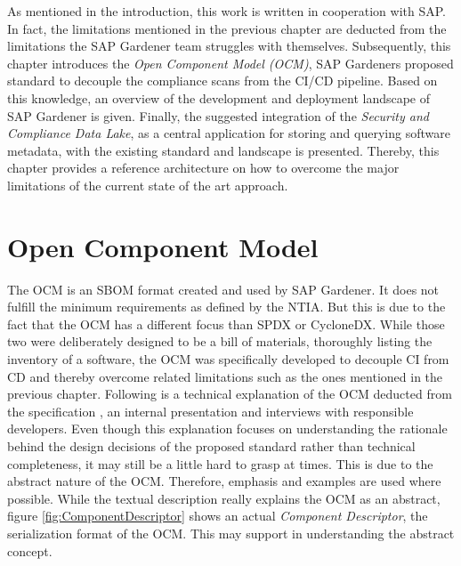 As mentioned in the introduction, this work is written in cooperation with SAP. %
In fact, the limitations mentioned in the previous chapter are deducted from the limitations the SAP Gardener team struggles with themselves. Subsequently, this chapter introduces the \textit{Open Component Model (OCM)}, SAP Gardeners proposed standard to decouple the compliance scans from the CI/CD pipeline. Based on this knowledge, an overview of the development and deployment landscape of SAP Gardener is given. Finally, the suggested integration of the \emph{Security and Compliance Data Lake}, as a central application for storing and querying software metadata, with the existing standard and landscape is presented. Thereby, this chapter provides a reference architecture on how to overcome the major limitations of the current state of the art approach. %

\section{Open Component Model} \label{sec:Open Component Model}
The OCM is an SBOM format created and used by SAP Gardener. It does not fulfill the minimum requirements as defined by the NTIA. But this is due to the fact that the OCM has a different focus than SPDX or CycloneDX. While those two were deliberately designed to be a bill of materials, %
 thoroughly listing the inventory of a software, the OCM was specifically developed to decouple CI from CD and thereby overcome related limitations such as the ones mentioned in the previous chapter. Following is a technical explanation of the OCM deducted from the specification \cite{OCMSpec}, an internal presentation \cite{OCMInternalPresentation} and interviews with responsible developers. Even though this explanation focuses on understanding the rationale behind the design decisions of the proposed standard rather than technical completeness, it may still be a little hard to grasp at times. This is due to the abstract nature of the OCM. Therefore, emphasis and examples are used where possible. While the textual description really explains the OCM as an abstract, figure \ref{fig:ComponentDescriptor} shows an actual \emph{Component Descriptor}, the serialization format of the OCM. This may support in understanding the abstract concept.\\\\

